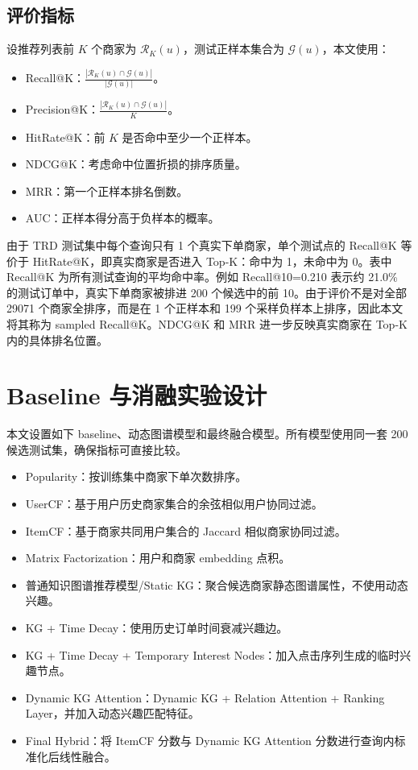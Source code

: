 \documentclass[UTF8,a4paper,12pt]{ctexart}
\begin{document}
\subsection{评价指标}

设推荐列表前 $K$ 个商家为 $\mathcal{R}_K(u)$，测试正样本集合为 $\mathcal{G}(u)$，本文使用：

\begin{itemize}
  \item Recall@K：$\frac{|\mathcal{R}_K(u)\cap \mathcal{G}(u)|}{|\mathcal{G}(u)|}$。
  \item Precision@K：$\frac{|\mathcal{R}_K(u)\cap \mathcal{G}(u)|}{K}$。
  \item HitRate@K：前 $K$ 是否命中至少一个正样本。
  \item NDCG@K：考虑命中位置折损的排序质量。
  \item MRR：第一个正样本排名倒数。
  \item AUC：正样本得分高于负样本的概率。
\end{itemize}

由于 TRD 测试集中每个查询只有 1 个真实下单商家，单个测试点的 Recall@K 等价于 HitRate@K，即真实商家是否进入 Top-K：命中为 1，未命中为 0。表中 Recall@K 为所有测试查询的平均命中率。例如 Recall@10=0.210 表示约 21.0\% 的测试订单中，真实下单商家被排进 200 个候选中的前 10。由于评价不是对全部 29071 个商家全排序，而是在 1 个正样本和 199 个采样负样本上排序，因此本文将其称为 sampled Recall@K。NDCG@K 和 MRR 进一步反映真实商家在 Top-K 内的具体排名位置。

\section{Baseline 与消融实验设计}

本文设置如下 baseline、动态图谱模型和最终融合模型。所有模型使用同一套 200 候选测试集，确保指标可直接比较。

\begin{itemize}
  \item Popularity：按训练集中商家下单次数排序。
  \item UserCF：基于用户历史商家集合的余弦相似用户协同过滤。
  \item ItemCF：基于商家共同用户集合的 Jaccard 相似商家协同过滤。
  \item Matrix Factorization：用户和商家 embedding 点积。
  \item 普通知识图谱推荐模型/Static KG：聚合候选商家静态图谱属性，不使用动态兴趣。
  \item KG + Time Decay：使用历史订单时间衰减兴趣边。
  \item KG + Time Decay + Temporary Interest Nodes：加入点击序列生成的临时兴趣节点。
  \item Dynamic KG Attention：Dynamic KG + Relation Attention + Ranking Layer，并加入动态兴趣匹配特征。
  \item Final Hybrid：将 ItemCF 分数与 Dynamic KG Attention 分数进行查询内标准化后线性融合。
\end{itemize}
\end{document}
